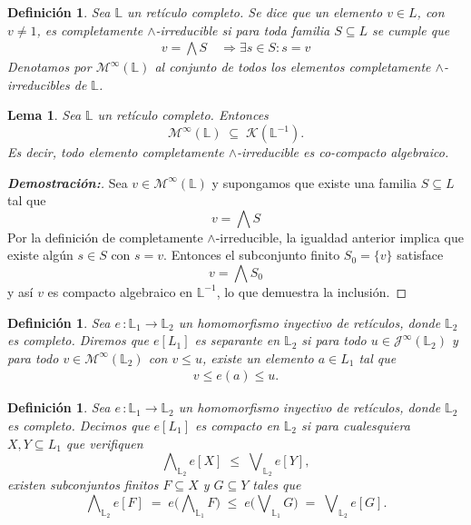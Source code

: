 \documentclass[12pt]{book}
\newtheorem{lemma}[theorem]{Lema}
\newtheorem{definition}[theorem]{Definición}
\begin{document}
\begin{definition} Sea $\mathbb{L}$ un retículo completo. Se dice que un elemento $v\in L$, con $v\neq 1$, es \emph{completamente $\wedge$-irreducible} si para toda familia $S\subseteq L$ se cumple que
\begin{align*}
v = \bigwedge S \quad \Longrightarrow \exists s\in S: s=v
\end{align*}
Denotamos por $\mathcal{M}^{\infty}(\mathbb{L})$ al conjunto de todos los elementos completamente $\wedge$-irreducibles de $\mathbb{L}$.
\end{definition}

\begin{lemma}\label{lem:meet-irr-implica-cocompact}
Sea $\mathbb L$ un retículo completo. Entonces
\[
\mathcal M^\infty(\mathbb L)\;\subseteq\; \mathcal{K}(\mathbb L^{-1}).
\]
Es decir, todo elemento completamente $\wedge$-irreducible es co-compacto algebraico.
\end{lemma}

\begin{proof}[\textbf{Demostración:}]
Sea $v\in\mathcal M^\infty(\mathbb L)$ y supongamos que existe una familia
$S\subseteq L$ tal que
\[
v=\bigwedge S
\]
Por la definición de completamente $\wedge$-irreducible, la igualdad anterior implica que existe algún $s\in S$ con $s=v$. Entonces el subconjunto finito $S_0=\{v\}$ satisface
\[v=\bigwedge S_0\]
y así $v$ es compacto algebraico en $\mathbb L^{-1}$, lo que demuestra la inclusión.
\end{proof}


\begin{definition} Sea $e\, \colon \mathbb{L}_1 \to \mathbb{L}_2$ un homomorfismo inyectivo de retículos, donde $\mathbb{L}_2$ es completo. Diremos que $e[L_1]$ es \emph{separante} en $\mathbb{L}_2$ si para todo $u\in \mathcal{J}^{\infty}(\mathbb{L}_2)$ y para todo $v\in \mathcal{M}^{\infty}(\mathbb{L}_2)$ con $v\le u$, existe un elemento $a\in L_1$ tal que
\begin{align*}
v \le e(a) \le u.
\end{align*}
\end{definition}


\begin{definition}
\label{def:compacto-en}
Sea $e\, \colon \mathbb{L}_1 \to \mathbb{L}_2$ un homomorfismo inyectivo de retículos, donde $\mathbb{L}_2$ es completo. Decimos que $e[L_1]$ es \emph{compacto} en $\mathbb{L}_2$ si
para cualesquiera $X,Y\subseteq L_1$ que verifiquen
\[
\bigwedge\nolimits_{\mathbb{L}_2} e[X] \;\leq\; \bigvee\nolimits_{\mathbb{L}_2} e[Y],
\]
existen subconjuntos finitos $F\subseteq X$ y $G\subseteq Y$ tales que
\[
\bigwedge\nolimits_{\mathbb{L}_2} e[F]
\;=\;
e\!\bigl(\bigwedge\nolimits_{\mathbb{L}_1} F\bigr)
\;\leq\;
e\!\bigl(\bigvee\nolimits_{\mathbb{L}_1} G\bigr)
\;=\;
\bigvee\nolimits_{\mathbb{L}_2} e[G].
\]
\end{definition}
\end{document}
